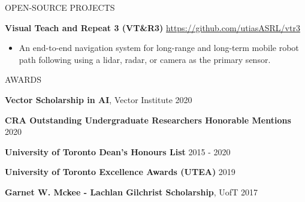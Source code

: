 \documentclass{cv}
\begin{document}
\begin{rSection}{OPEN-SOURCE PROJECTS}
  \item \textbf{Visual Teach and Repeat 3 (VT\&R3)} \hfill \href{https://github.com/utiasASRL/vtr3}{https://github.com/utiasASRL/vtr3}
  \vspace{-0.25em}
  \begin{itemize}[noitemsep,topsep=0pt]
    \item An end-to-end navigation system for long-range and long-term mobile robot path following using a lidar, radar, or camera as the primary sensor.
  \end{itemize}
\end{rSection}

\begin{rSection}{AWARDS}
  \item \textbf{Vector Scholarship in AI}, Vector Institute \hfill 2020
  \item \textbf{CRA Outstanding Undergraduate Researchers Honorable Mentions} \hfill 2020
  \item \textbf{University of Toronto Dean's Honours List} \hfill 2015 - 2020
  \item \textbf{University of Toronto Excellence Awards (UTEA)} \hfill 2019
  \item \textbf{Garnet W. Mckee - Lachlan Gilchrist Scholarship}, UofT \hfill 2017
\end{rSection}
\end{document}
